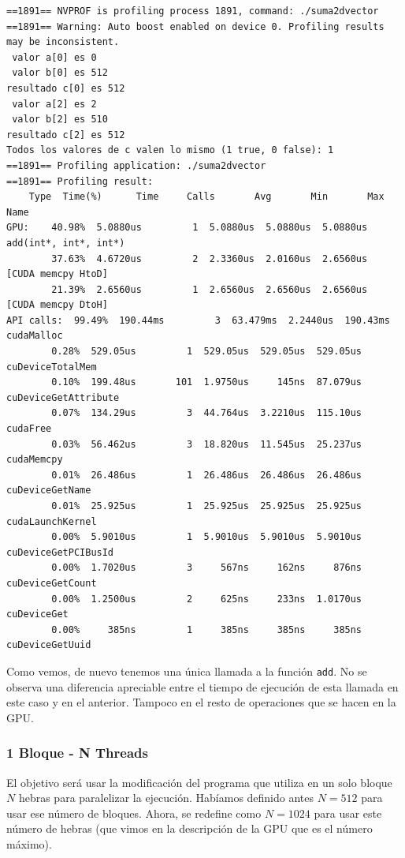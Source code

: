 \documentclass[11pt]{article}
\def\inline{\lstinline[basicstyle=\ttfamily,keywordstyle={}]}
\theoremstyle{plain}
\begin{document}
\begin{verbatim}
==1891== NVPROF is profiling process 1891, command: ./suma2dvector
==1891== Warning: Auto boost enabled on device 0. Profiling results may be inconsistent.
 valor a[0] es 0
 valor b[0] es 512
resultado c[0] es 512
 valor a[2] es 2
 valor b[2] es 510
resultado c[2] es 512
Todos los valores de c valen lo mismo (1 true, 0 false): 1
==1891== Profiling application: ./suma2dvector
==1891== Profiling result:
	Type  Time(%)      Time     Calls       Avg       Min       Max  Name
GPU:    40.98%  5.0880us         1  5.0880us  5.0880us  5.0880us  add(int*, int*, int*)
        37.63%  4.6720us         2  2.3360us  2.0160us  2.6560us  [CUDA memcpy HtoD]
        21.39%  2.6560us         1  2.6560us  2.6560us  2.6560us  [CUDA memcpy DtoH]
API calls:  99.49%  190.44ms         3  63.479ms  2.2440us  190.43ms  cudaMalloc
		0.28%  529.05us         1  529.05us  529.05us  529.05us  cuDeviceTotalMem
		0.10%  199.48us       101  1.9750us     145ns  87.079us  cuDeviceGetAttribute
		0.07%  134.29us         3  44.764us  3.2210us  115.10us  cudaFree
		0.03%  56.462us         3  18.820us  11.545us  25.237us  cudaMemcpy
		0.01%  26.486us         1  26.486us  26.486us  26.486us  cuDeviceGetName
		0.01%  25.925us         1  25.925us  25.925us  25.925us  cudaLaunchKernel
		0.00%  5.9010us         1  5.9010us  5.9010us  5.9010us  cuDeviceGetPCIBusId
		0.00%  1.7020us         3     567ns     162ns     876ns  cuDeviceGetCount
		0.00%  1.2500us         2     625ns     233ns  1.0170us  cuDeviceGet
		0.00%     385ns         1     385ns     385ns     385ns  cuDeviceGetUuid
\end{verbatim}

Como vemos, de nuevo tenemos una única llamada a la función \inline{add}. No se observa una diferencia apreciable entre el tiempo de ejecución de esta llamada en este caso y en el anterior. Tampoco en el resto de operaciones que se hacen en la GPU.

\subsubsection*{1 Bloque - N Threads}

El objetivo será usar la modificación del programa que utiliza en un solo bloque $N$ hebras para paralelizar la ejecución. Habíamos definido antes $N=512$ para usar ese número de bloques. Ahora, se redefine como $N=1024$ para usar este número de hebras (que vimos en la descripción de la GPU que es el número máximo).
\end{document}
